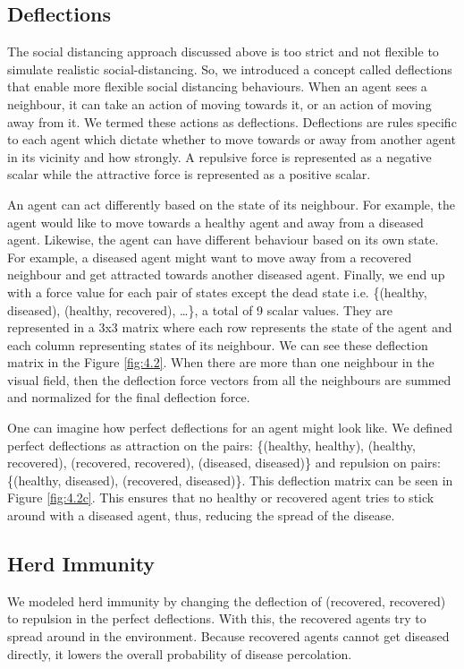 \documentclass[a4paper,11pt]{article}
\begin{document}
    \subsection{Deflections}\label{subsec:deflections}
    The social distancing approach discussed above is too strict and not flexible to simulate realistic social-distancing.
    So, we introduced a concept called deflections that enable more flexible social distancing behaviours.
    When an agent sees a neighbour, it can take an action of moving towards it, or an action of moving away from it.
    We termed these actions as deflections.
    Deflections are rules specific to each agent which dictate whether to move towards or away from another agent in its vicinity and how strongly.
    A repulsive force is represented as a negative scalar while the attractive force is represented as a positive scalar.

    An agent can act differently based on the state of its neighbour.
    For example, the agent would like to move towards a healthy agent and away from a diseased agent.
    Likewise, the agent can have different behaviour based on its own state.
    For example, a diseased agent might want to move away from a recovered neighbour and get attracted towards another diseased agent.
    Finally, we end up with a force value for each pair of states except the dead state i.e.
    \{(healthy, diseased), (healthy, recovered), \ldots \}, a total of 9 scalar values.
    They are represented in a 3x3 matrix where each row represents the state of the agent and each column representing states of its neighbour.
    We can see these deflection matrix in the Figure \ref{fig:4.2}.
    When there are more than one neighbour in the visual field, then the deflection force vectors from all the neighbours are summed and normalized for the final deflection force.

    One can imagine how perfect deflections for an agent might look like.
    We defined perfect deflections as attraction on the pairs: \{(healthy, healthy), (healthy, recovered), (recovered, recovered), (diseased, diseased)\} and repulsion on pairs: \{(healthy, diseased), (recovered, diseased)\}.
    This deflection matrix can be seen in Figure \ref{fig:4.2c}.
    This ensures that no healthy or recovered agent tries to stick around with a diseased agent, thus, reducing the spread of the disease.

    \subsection{Herd Immunity}\label{subsec:herd-immunity}
    We modeled herd immunity\cite{herdImm} by changing the deflection of (recovered, recovered) to repulsion in the perfect deflections.
    With this, the recovered agents try to spread around in the environment.
    Because recovered agents cannot get diseased directly, it lowers the overall probability of disease percolation.
\end{document}

